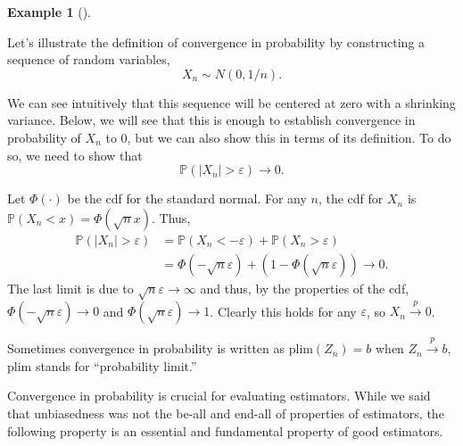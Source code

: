\documentclass[
  letterpaper,
  DIV=11,
  numbers=noendperiod]{scrreprt}
\renewcommand{\P}{\mathbb{P}}
\newcommand{\inprob}{\overset{p}{\to}}
\theoremstyle{plain}
\theoremstyle{definition}
\theoremstyle{definition}
\newtheorem{example}{Example}[chapter]
\theoremstyle{remark}
\begin{document}
\begin{example}[]\protect\hypertarget{exm-inprob}{}\label{exm-inprob}

Let's illustrate the definition of convergence in probability by
constructing a sequence of random variables, \[
X_n \sim N(0, 1/n).
\]

We can see intuitively that this sequence will be centered at zero with
a shrinking variance. Below, we will see that this is enough to
establish convergence in probability of \(X_n\) to 0, but we can also
show this in terms of its definition. To do so, we need to show that \[
\P(|X_n| > \varepsilon) \to 0.
\]

Let \(\Phi(\cdot)\) be the cdf for the standard normal. For any \(n\),
the cdf for \(X_n\) is \(\P(X_{n} < x) = \Phi(\sqrt{n}x)\). Thus, \[
\begin{aligned}
\P(|X_n| > \varepsilon) &= \P(X_n < -\varepsilon) + \P(X_n > \varepsilon) \\ &= \Phi(-\sqrt{n}\varepsilon) + (1 - \Phi(\sqrt{n}\varepsilon)) \to 0.
\end{aligned}
\] The last limit is due to \(\sqrt{n}\varepsilon \to \infty\) and thus,
by the properties of the cdf, \(\Phi(-\sqrt{n}\varepsilon) \to 0\) and
\(\Phi(\sqrt{n}\varepsilon) \to 1\). Clearly this holds for any
\(\varepsilon\), so \(X_n \inprob 0\).

\end{example}

\begin{tcolorbox}[enhanced jigsaw, leftrule=.75mm, left=2mm, colbacktitle=quarto-callout-note-color!10!white, toptitle=1mm, toprule=.15mm, colframe=quarto-callout-note-color-frame, arc=.35mm, colback=white, opacitybacktitle=0.6, breakable, bottomtitle=1mm, coltitle=black, titlerule=0mm, title=\textcolor{quarto-callout-note-color}{\faInfo}\hspace{0.5em}{Notation alert}, opacityback=0, rightrule=.15mm, bottomrule=.15mm]

Sometimes convergence in probability is written as
\(\text{plim}(Z_n) = b\) when \(Z_n \inprob b\), \(\text{plim}\) stands
for ``probability limit.''

\end{tcolorbox}

Convergence in probability is crucial for evaluating estimators. While
we said that unbiasedness was not the be-all and end-all of properties
of estimators, the following property is an essential and fundamental
property of good estimators.
\end{document}
